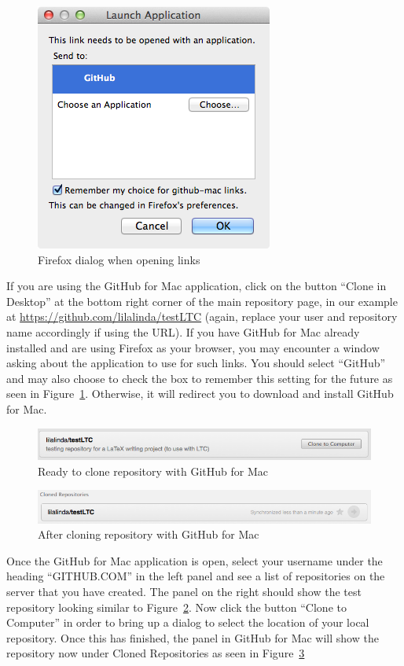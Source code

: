 \begin{figure}
\centering
\includegraphics[scale=\myscale]{figures/firefox-application}
\caption{Firefox dialog when opening  links} \label{fig:firefox-application}
\end{figure}
If you are using the GitHub for Mac application, click on the button ``Clone in Desktop'' at the bottom right corner of the main repository page, in our example at \url{https://github.com/lilalinda/testLTC} (again, replace your user and repository name accordingly if using the URL).  If you have GitHub for Mac already installed and are using Firefox as your browser, you may encounter a window asking about the application to use for such links.  You should select ``GitHub'' and may also choose to check the box to remember this setting for the future as seen in Figure~\ref{fig:firefox-application}.  Otherwise, it will redirect you to download and install GitHub for Mac.

\begin{figure}
\centering
\includegraphics[scale=\myscale]{figures/github-mac-before-clone}
\caption{Ready to clone repository with GitHub for Mac} \label{fig:github-mac-before-clone}
\end{figure}
\begin{figure}
\centering
\includegraphics[scale=\myscale]{figures/github-mac-after-clone}
\caption{After cloning repository with GitHub for Mac} \label{fig:github-mac-after-clone}
\end{figure}
Once the GitHub for Mac application is open, select your username under the heading ``GITHUB.COM'' in the left panel and see a list of repositories on the server that you have created.  The panel on the right should show the test repository looking similar to Figure~\ref{fig:github-mac-before-clone}.  Now click the button ``Clone to Computer'' in order to bring up a dialog to select the location of your local repository.  Once this has finished, the panel in GitHub for Mac will show the repository now under Cloned Repositories as seen in Figure~\ref{fig:github-mac-after-clone}

